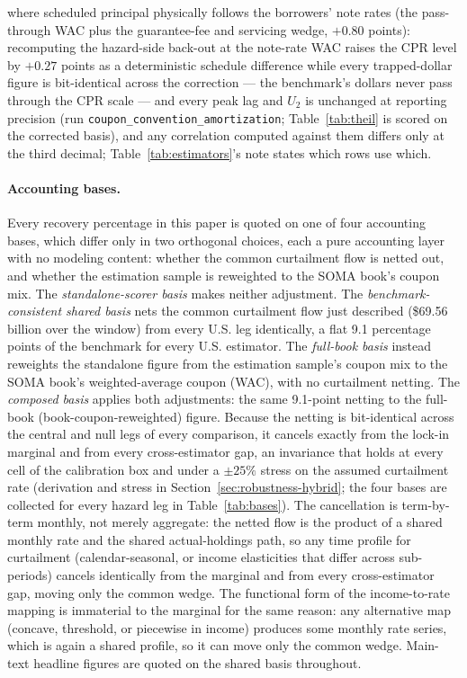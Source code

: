 \documentclass[12pt]{article}
\begin{document}
where scheduled principal physically follows the borrowers' note rates (the pass-through WAC plus the guarantee-fee and servicing wedge, $+0.80$ points): recomputing the hazard-side back-out at the note-rate WAC raises the CPR level by $+0.27$ points as a deterministic schedule difference while every trapped-dollar figure is bit-identical across the correction --- the benchmark's dollars never pass through the CPR scale --- and every peak lag and $U_2$ is unchanged at reporting precision (run \texttt{coupon\_convention\_amortization}; Table~\ref{tab:theil} is scored on the corrected basis), and any correlation computed against them differs only at the third decimal; Table~\ref{tab:estimators}'s note states which rows use which. 

\paragraph{Accounting bases.} Every recovery percentage in this paper is quoted on one of four accounting bases, which differ only in two orthogonal choices, each a pure accounting layer with no modeling content: whether the common curtailment flow is netted out, and whether the estimation sample is reweighted to the SOMA book's coupon mix. The \emph{standalone-scorer basis} makes neither adjustment. The \emph{benchmark-consistent shared basis} nets the common curtailment flow just described (\$69.56 billion over the window) from every U.S. leg identically, a flat 9.1 percentage points of the benchmark for every U.S. estimator. The \emph{full-book basis} instead reweights the standalone figure from the estimation sample's coupon mix to the SOMA book's weighted-average coupon (WAC), with no curtailment netting. The \emph{composed basis} applies both adjustments: the same 9.1-point netting to the full-book (book-coupon-reweighted) figure. Because the netting is bit-identical across the central and null legs of every comparison, it cancels exactly from the lock-in marginal and from every cross-estimator gap, an invariance that holds at every cell of the calibration box and under a $\pm 25\%$ stress on the assumed curtailment rate (derivation and stress in Section~\ref{sec:robustness-hybrid}; the four bases are collected for every hazard leg in Table~\ref{tab:bases}). The cancellation is term-by-term monthly, not merely aggregate: the netted flow is the product of a shared monthly rate and the shared actual-holdings path, so any time profile for curtailment (calendar-seasonal, or income elasticities that differ across sub-periods) cancels identically from the marginal and from every cross-estimator gap, moving only the common wedge. The functional form of the income-to-rate mapping is immaterial to the marginal for the same reason: any alternative map (concave, threshold, or piecewise in income) produces some monthly rate series, which is again a shared profile, so it can move only the common wedge. Main-text headline figures are quoted on the shared basis throughout.
\end{document}
